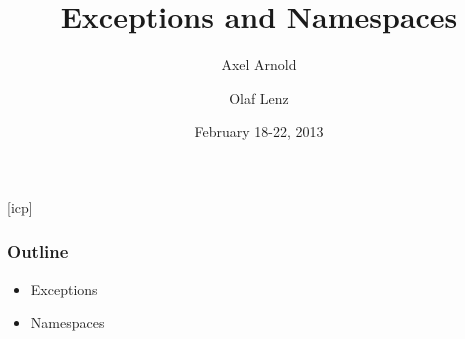 \documentclass{slides}
\begin{document}
\graphicspath{{figures/}}

\title[Exceptions and Namespaces]{\Large Exceptions and Namespaces}

\author[A. Arnold and O. Lenz]{Axel Arnold \and Olaf Lenz} 
\date{February 18-22, 2013}

\begin{frame}
  \titlepage
\end {frame}
[icp]

\begin{frame}
  \frametitle{Outline}
  \begin{itemize}
  \item Exceptions
  \item Namespaces
  \end{itemize}
\end{frame}
\end{document}
